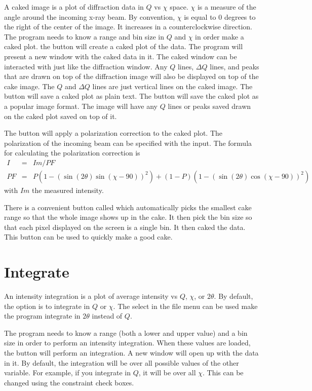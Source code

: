 A caked image is a plot of diffraction data in $Q$ vs 
$\chi$ space. $\chi$ is a measure of the angle around 
the incoming x-ray beam. By convention, $\chi$ is equal to 0
degrees to the right of the center of the image. It
increases in a counterclockwise direction. 
The program needs to know a range and bin size in $Q$ and
$\chi$ in order make a caked plot. the  button
will create a caked plot of the data. The 
program will present a new window with the caked data in
it. The caked window can be interacted with just like
the diffraction window. Any $Q$ lines, $\Delta Q$ lines,
and peaks that are drawn on top of the diffraction image
will also be displayed on top of the cake image.
The $Q$ and $\Delta Q$ lines are just vertical lines on the
caked image. The  button will save a caked plot 
as plain text. The  button will save the
caked plot as a popular image format.
The image will have any $Q$ lines or peaks saved drawn on 
the caked plot saved on top of it.

The  button will apply a 
polarization correction to the caked plot. The polarization
of the incoming beam can be specified with the 
 input. The formula for calculating the 
polarization correction is
\begin{eqnarray}
    I&=&Im/PF \\ 
    PF&=&P(1 - (\sin(2\theta)\sin(\chi-90))^2) + 
    (1 - P)(1 - (\sin(2\theta)\cos(\chi-90))^2)
\end{eqnarray}
with $Im$ the measured intensity. 

There is a convenient button called  which 
automatically picks the smallest cake range so that the whole 
image shows up in the cake. It then pick the bin size so that 
each pixel displayed on the screen is a single bin.  It then 
caked the data. This button can be used to quickly make a
good cake.

\section{Integrate}

An intensity integration is a plot of average intensity
vs $Q$, $\chi$, or $2\theta$. By default, the option is to 
integrate in $Q$ or $\chi$. The  select 
in the file menu can be used make the program integrate
in $2\theta$ instead of $Q$.  

The program needs to know a range (both a lower and upper value)
and a bin size in order to perform an intensity integration.
When these values are loaded, the  button will 
perform an integration. A new window will open up with the
data in it. By default, the integration will be over all 
possible values of the other variable. For example, if you integrate 
in $Q$, it will be over all $\chi$. This can be changed using the
constraint check boxes. 

